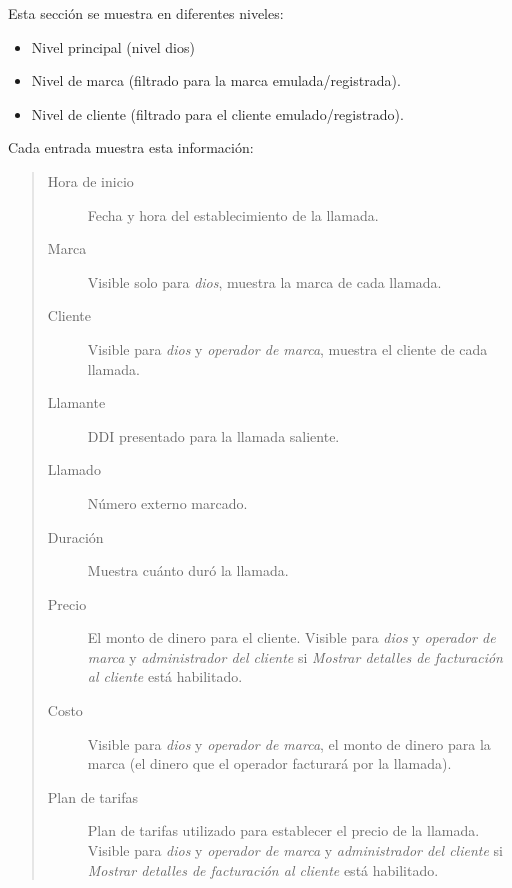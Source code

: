 \documentclass[letterpaper,10pt,spanish]{sphinxmanual}
\begin{document}
Esta sección se muestra en diferentes niveles:
\begin{itemize}
\item {} 
Nivel principal (nivel dios)

\item {} 
Nivel de marca (filtrado para la marca emulada/registrada).

\item {} 
Nivel de cliente (filtrado para el cliente emulado/registrado).

\end{itemize}

Cada entrada muestra esta información:
\begin{quote}
\begin{description}
\item[{Hora de inicio}] \leavevmode
Fecha y hora del establecimiento de la llamada.

\item[{Marca}] \leavevmode
Visible solo para \emph{dios}, muestra la marca de cada llamada.

\item[{Cliente}] \leavevmode
Visible para \emph{dios} y \emph{operador de marca}, muestra el cliente de cada llamada.

\item[{Llamante}] \leavevmode
DDI presentado para la llamada saliente.

\item[{Llamado}] \leavevmode
Número externo marcado.

\item[{Duración}] \leavevmode
Muestra cuánto duró la llamada.

\item[{Precio}] \leavevmode
El monto de dinero para el cliente. Visible para \emph{dios} y \emph{operador de marca} y \emph{administrador del cliente} si \emph{Mostrar detalles de facturación al cliente} está habilitado.

\item[{Costo}] \leavevmode
Visible para \emph{dios} y \emph{operador de marca}, el monto de dinero para la marca (el dinero que el operador facturará por la llamada).

\item[{Plan de tarifas}] \leavevmode
Plan de tarifas utilizado para establecer el precio de la llamada. Visible para \emph{dios} y \emph{operador de marca} y \emph{administrador del cliente} si \emph{Mostrar detalles de facturación al cliente} está habilitado.


\end{description}
\end{quote}
\end{document}

